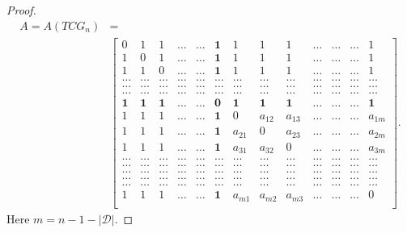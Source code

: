 \documentclass[10pt,a4paper]{amsart}
\begin{document}
\begin{proof}
		\begin{equation}
			\label{Eq0}
			\begin{split}
				A=A(TCG_n)&=
				\\
				&
				\left[
				\begin{array}{cccccccccccccccccc}
					0 & 1 & 1& \ldots &\dots & \textbf{1}&1 & 1 & 1& \ldots&\ldots &\ldots& 1\\
					1 & 0 & 1& \ldots &\dots &\textbf{1}&1 & 1 & 1& \ldots &\ldots&\ldots& 1\\
					1& 1 & 0 &\ldots&\dots& \textbf{1}&1 & 1 & 1& \ldots &\ldots&\ldots& 1\\
					\ldots& \ldots &\ldots &\ldots&\ldots& \ldots &\ldots &\ldots&\ldots&\ldots&\ldots&\ldots&\ldots\\
					\ldots& \ldots &\ldots &\ldots&\ldots& \ldots &\ldots &\ldots&\ldots&\ldots&\ldots&\ldots&\ldots\\
					\ldots& \ldots &\ldots &\ldots&\ldots& \ldots &\ldots &\ldots&\ldots&\ldots&\ldots&\ldots&\ldots\\
					\textbf{1}& \textbf{1} &\textbf{1}&\ldots &\ldots& \textbf{0} &\textbf{1} & \textbf{1} & \textbf{1}& \ldots &\ldots&\ldots& \textbf{1}\\
					1 & 1 &1  & \ldots&\ldots&\textbf{1} & 0 & a_{12} &a_{13}& \ldots&\ldots&\ldots&a_{1m}\\
					1 & 1 &1 & \ldots&\ldots & \textbf{1}& a_{21} & 0 &a_{23}& \ldots&\ldots&\ldots&a_{2m}\\
					1& 1 & 1 &\ldots&\dots& \textbf{1}&a_{31} & a_{32} & 0& \ldots &\ldots&\ldots& a_{3m}\\
					\ldots& \ldots &\ldots &\ldots&\ldots& \ldots &\ldots &\ldots&\ldots& \ldots&\ldots&\ldots&\ldots \\
					\ldots& \ldots &\ldots &\ldots&\ldots& \ldots &\ldots &\ldots&\ldots& \ldots &\ldots&\ldots&\ldots\\
					\ldots& \ldots &\ldots &\ldots&\ldots& \ldots &\ldots &\ldots&\ldots& \ldots &\ldots&\ldots&\ldots\\
					\ldots& \ldots &\ldots &\ldots&\ldots& \ldots &\ldots &\ldots&\ldots& \ldots &\ldots&\ldots&\ldots\\
					\ldots& \ldots &\ldots &\ldots&\ldots& \ldots &\ldots &\ldots&\ldots&\ldots&\ldots&\ldots&\ldots\\
					1 & 1 & 1 &  \ldots& \dots&\textbf{1}& a_{m1} & a_{m2} &  a_{m3}&\ldots&\ldots&\ldots& 0\\
				\end{array}
				\right].
			\end{split}
		\end{equation}
		Here $m=n-1-|\mathcal{D}|.$
		

\end{proof}
\end{document}

